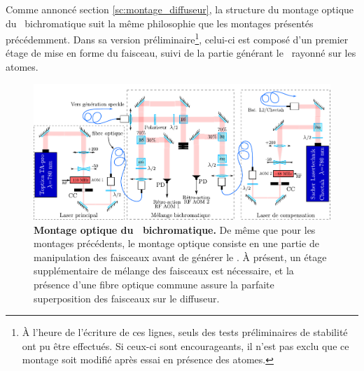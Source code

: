 Comme annoncé section \ref{sc:montage_diffuseur}, la structure du montage optique du \speckle\ bichromatique suit la même philosophie que les montages présentés précédemment. Dans sa version préliminaire\footnote{À l'heure de l'écriture de ces lignes, seuls des tests préliminaires de stabilité ont pu être effectués. Si ceux-ci sont encourageants, il n'est pas exclu que ce montage soit modifié après essai en présence des atomes.}, celui-ci est composé d'un premier étage de mise en forme du faisceau, suivi de la partie générant le \speckle\ rayonné sur les atomes.

\begin{figure}
\centering
\includegraphics[width=\textwidth]{Fig/Speckle/montage_speckle_bichromatique.pdf}
\caption{\textbf{Montage optique du \speckle\ bichromatique.} De même que pour les montages précédents, le montage optique consiste en une partie de manipulation des faisceaux avant de générer le \speckle . À présent, un étage supplémentaire de mélange des faisceaux est nécessaire, et la présence d'une fibre optique commune assure la parfaite superposition des faisceaux sur le diffuseur.}
\label{fig:montage_speckle_bichromatique}
\end{figure}


